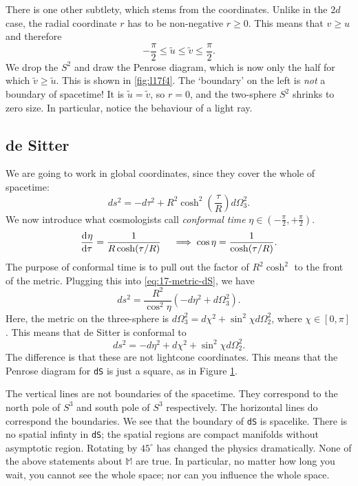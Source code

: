 There is one other subtlety, which stems from the coordinates. Unlike in the $2d$ case, the radial coordinate $r$ has to be non-negative $r \geq 0$. This means that $v \geq u$ and therefore 
\begin{equation}
  -\frac{\pi}{2} \leq \widetilde{u} \leq \tilde{v} \leq \frac{\pi}{2}.
\end{equation}
We drop the $S^2$ and draw the Penrose diagram, which is now only the half for which $\tilde{v} \geq \tilde{u}$.
This is shown in \ref{fig:l17f4}.
The `boundary' on the left is \emph{not} a boundary of spacetime! It is $\tilde{u} = \tilde{v}$, so $r = 0$, and the two-sphere  $S^2$ shrinks to zero size.
In particular, notice the behaviour of a light ray.

\subsection{de Sitter}%
\label{sub:de_sitter}

We are going to work in global coordinates, since they cover the whole of spacetime:
\begin{equation}
  \label{eq:17-metric-dS}
  ds^2 = - d\tau^2 + R^2 \cosh^2 \left(\frac{\tau}{R}\right) d\Omega^2_3.
\end{equation}
We now introduce what cosmologists call \emph{conformal time} $\eta \in (- \frac{\pi}{2}, + \frac{\pi}{2})$. 
\begin{equation}
  \dv[]{\eta}{\tau} = \frac{1}{R \cosh(\tau/ R)} \quad \implies \cos \eta = \frac{1}{\cosh ( \tau / R)}.
\end{equation}
The purpose of conformal time is to pull out the factor of $R^2 \cosh^2$ to the front of the metric.
Plugging this into \eqref{eq:17-metric-dS}, we have
\begin{equation}
  ds^2 = \frac{R^2}{\cos^2 \eta} (- d\eta^2 + d\Omega^2_3).
\end{equation}
Here, the metric on the three-sphere is $d\Omega^2_3 = d\chi^2 + \sin^2 \chi d\Omega^2_2$, where $\chi \in [0, \pi]$.
This means that de Sitter is conformal to
 \begin{equation}
  ds^2 = -d\eta^2 + d\chi^2 + \sin^2 \chi d\Omega^2_2.
\end{equation}
The difference is that these are not lightcone coordinates. This means that the Penrose diagram for \texttt{dS} is just a square, as in Figure \ref{fig:l17f5}.
\begin{figure}[bthp]
  \centering
  \def\svgwidth{0.5\columnwidth}
  
  \caption{}
  \label{fig:l17f5}
\end{figure}
The vertical lines are not boundaries of the spacetime. They correspond to the north pole of $S^3$ and south pole of $S^3$ respectively.
The horizontal lines do correspond the boundaries.
We see that the boundary of \texttt{dS} is spacelike.
There is no spatial infinty in \texttt{dS}; the spatial regions are compact manifolds without asymptotic region.
Rotating by $45^\circ$ has changed the physics dramatically. None of the above statements about $\mathbb{M}$ are true.
In particular, no matter how long you wait, you cannot see the whole space; nor can you influence the whole space.


